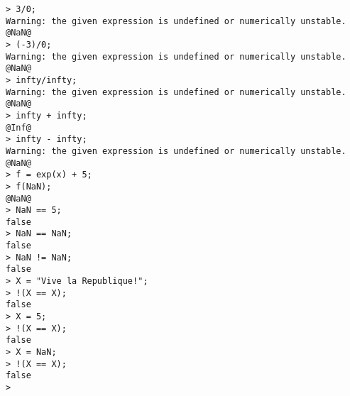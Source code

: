 \begin{center}\begin{minipage}{15cm}\begin{Verbatim}[frame=single]
> 3/0;
Warning: the given expression is undefined or numerically unstable.
@NaN@
> (-3)/0;
Warning: the given expression is undefined or numerically unstable.
@NaN@
> infty/infty;
Warning: the given expression is undefined or numerically unstable.
@NaN@
> infty + infty;
@Inf@
> infty - infty;
Warning: the given expression is undefined or numerically unstable.
@NaN@
> f = exp(x) + 5;
> f(NaN);
@NaN@
> NaN == 5;
false
> NaN == NaN;
false
> NaN != NaN;
false
> X = "Vive la Republique!";
> !(X == X);
false
> X = 5;
> !(X == X);
false
> X = NaN;
> !(X == X);
false
> 
\end{Verbatim}
\end{minipage}\end{center}
